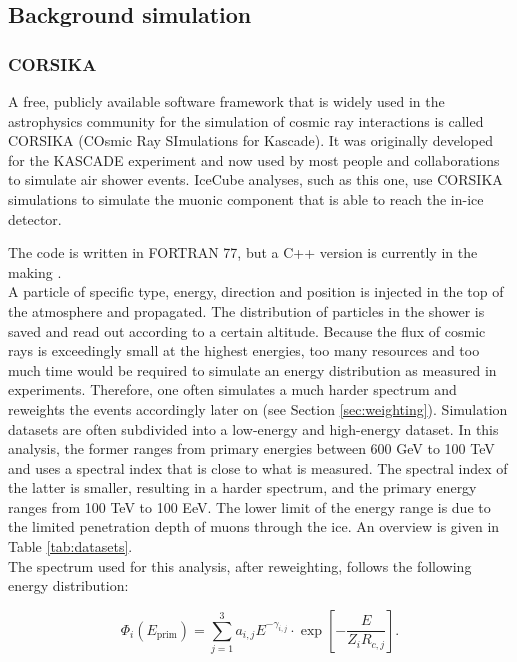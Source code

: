 \subsection{Background simulation}
\subsubsection{CORSIKA}
\label{subsub:corsika}
A free, publicly available software framework that is widely used in the astrophysics community for the simulation of cosmic ray interactions is called CORSIKA  (COsmic Ray SImulations for Kascade). It was originally developed for the KASCADE experiment and now used by most people and collaborations to simulate air shower events. IceCube analyses, such as this one, use CORSIKA simulations to simulate the muonic component that is able to reach the in-ice detector.

The code is written in FORTRAN 77, but a C++ version is currently in the making \cite{Engel:2018akg}.\\

\noindent A particle of specific type, energy, direction and position is injected in the top of the atmosphere and propagated. The distribution of particles in the shower is saved and read out according to a certain altitude. Because the flux of cosmic rays is exceedingly small at the highest energies, too many resources and too much time would be required to simulate an energy distribution as measured in experiments. Therefore, one often simulates a much harder spectrum and reweights the events accordingly later on (see Section \ref{sec:weighting}). Simulation datasets are often subdivided into a low-energy and high-energy dataset. In this analysis, the former ranges from primary energies between 600 GeV to 100 TeV and uses a spectral index that is close to what is measured. The spectral index of the latter is smaller, resulting in a harder spectrum, and the primary energy ranges from 100 TeV to 100 EeV. The lower limit of the energy range is due to the limited penetration depth of muons through the ice. An overview is given in Table \ref{tab:datasets}.\\

\noindent The spectrum used for this analysis, after reweighting, follows the following energy distribution:

\begin{equation}
\label{eq:gaisser}
\Phi_i \left(E_{\textrm{prim}}\right) = \sum^3_{j=1} a_{i,j} E^{-\gamma_{i,j}} \cdot \exp \left[- \frac{E}{Z_i R_{c,j}}\right].
\end{equation}

